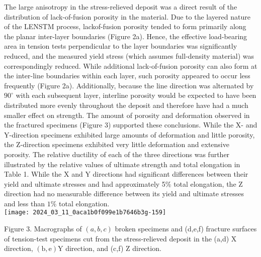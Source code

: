 \documentclass[10pt]{article}
\begin{document}
The large anisotropy in the stress-relieved deposit was a direct result of the distribution of lack-of-fusion porosity in the material. Due to the layered nature of the LENSTM process, lackof-fusion porosity tended to form primarily along the planar inter-layer boundaries (Figure 2a). Hence, the effective load-bearing area in tension tests perpendicular to the layer boundaries was significantly reduced, and the measured yield stress (which assumes full-density material) was correspondingly reduced. While additional lack-of-fusion porosity can also form at the inter-line boundaries within each layer, such porosity appeared to occur less frequently (Figure 2a). Additionally, because the line direction was alternated by $90^{\circ}$ with each subsequent layer, interline porosity would be expected to have been distributed more evenly throughout the deposit and therefore have had a much smaller effect on strength. The amount of porosity and deformation observed in the fractured specimens (Figure 3) supported these conclusions. While the X- and Y-direction specimens exhibited large amounts of deformation and little porosity, the Z-direction specimens exhibited very little deformation and extensive porosity. The relative ductility of each of the three directions was further illustrated by the relative values of ultimate strength and total elongation in Table 1. While the $\mathrm{X}$ and $\mathrm{Y}$ directions had significant differences between their yield and ultimate stresses and had approximately 5\% total elongation, the $\mathrm{Z}$ direction had no measurable difference between its yield and ultimate stresses and less than $1 \%$ total elongation.\\
\texttt{[image: 2024\_03\_11\_0aca1b0f099e1b7646b3g-159]}

Figure 3. Macrographs of $(a, b, c)$ broken specimens and (d,e,f) fracture surfaces of tension-test specimens cut from the stress-relieved deposit in the (a,d) $\mathrm{X}$ direction, $(\mathrm{b}, \mathrm{e}) \mathrm{Y}$ direction, and (c,f) $\mathrm{Z}$ direction.
\end{document}
